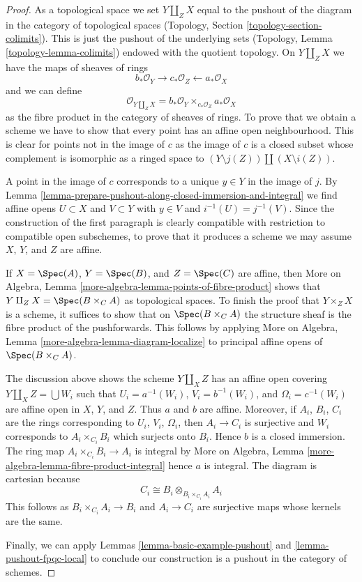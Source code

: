 \begin{proof}
As a topological space we set $Y \amalg_Z X$ equal to the pushout of
the diagram in the category of topological spaces (Topology, Section
\ref{topology-section-colimits}). This is just the pushout
of the underlying sets (Topology, Lemma \ref{topology-lemma-colimits})
endowed with the quotient topology.
On $Y \amalg_Z X$ we have the maps of sheaves of rings
$$
b_*\mathcal{O}_Y \longrightarrow c_*\mathcal{O}_Z
\longleftarrow a_*\mathcal{O}_X
$$
and we can define
$$
\mathcal{O}_{Y \amalg_Z X} =
b_*\mathcal{O}_Y \times_{c_*\mathcal{O}_Z} a_*\mathcal{O}_X
$$
as the fibre product in the category of sheaves of rings. To prove that we
obtain a scheme we have to show that every point has an
affine open neighbourhood. This is clear for points not in the image of $c$
as the image of $c$ is a closed subset whose complement is
isomorphic as a ringed space to $(Y \setminus j(Z)) \amalg (X \setminus i(Z))$.

\medskip\noindent
A point in the image of $c$ corresponds to a unique $y \in Y$
in the image of $j$. By
Lemma \ref{lemma-prepare-pushout-along-closed-immersion-and-integral}
we find affine opens $U \subset X$ and $V \subset Y$ with
$y \in V$ and $i^{-1}(U) = j^{-1}(V)$.
Since the construction of the first paragraph is clearly compatible
with restriction to compatible open subschemes, to prove that it
produces a scheme we may assume $X$, $Y$, and $Z$ are affine.

\medskip\noindent
If $X = \Spec(A)$, $Y = \Spec(B)$, and $Z = \Spec(C)$ are affine, then
More on Algebra, Lemma \ref{more-algebra-lemma-points-of-fibre-product}
shows that $Y \amalg_Z X = \Spec(B \times_C A)$ as topological spaces.
To finish the proof that $Y \times_Z X$ is a scheme, it suffices to show
that on $\Spec(B \times_C A)$ the structure sheaf is the fibre product
of the pushforwards. This follows by applying
More on Algebra, Lemma \ref{more-algebra-lemma-diagram-localize}
to principal affine opens of $\Spec(B \times_C A)$.

\medskip\noindent
The discussion above shows the scheme $Y \amalg_X Z$
has an affine open covering $Y \amalg_X Z = \bigcup W_i$
such that $U_i = a^{-1}(W_i)$, $V_i = b^{-1}(W_i)$, and
$\Omega_i = c^{-1}(W_i)$ are affine open in $X$, $Y$, and $Z$.
Thus $a$ and $b$ are affine.
Moreover, if $A_i$, $B_i$, $C_i$ are the rings corresponding to
$U_i$, $V_i$, $\Omega_i$, then $A_i \to C_i$ is surjective and
$W_i$ corresponds to $A_i \times_{C_i} B_i$ which surjects onto
$B_i$. Hence $b$ is a closed immersion.
The ring map $A_i \times_{C_i} B_i \to A_i$ is integral by
More on Algebra, Lemma \ref{more-algebra-lemma-fibre-product-integral}
hence $a$ is integral. The diagram is cartesian because
$$
C_i \cong B_i \otimes_{B_i \times_{C_i} A_i} A_i
$$
This follows as $B_i \times_{C_i} A_i \to B_i$
and $A_i \to C_i$ are surjective maps whose kernels are the same.

\medskip\noindent
Finally, we can apply Lemmas \ref{lemma-basic-example-pushout} and
\ref{lemma-pushout-fpqc-local} to conclude our construction is a pushout
in the category of schemes.
\end{proof}

